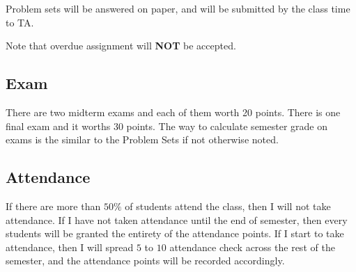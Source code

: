 \documentclass[12pt]{article}
\begin{document}
Problem sets will be answered on paper, and will be submitted by the class time to TA.

Note that overdue assignment will \textbf{NOT} be accepted.

\subsection*{Exam}
\label{sub:Exam}

There are two midterm exams and each of them worth 20 points.
There is one final exam and it worths 30 points.
The way to calculate semester grade on exams is the similar to the Problem Sets if not otherwise noted.

\subsection*{Attendance}
\label{sub:Attendance}

If there are more than $ 50\% $ of students attend the class, then I will not take attendance.
If I have not taken attendance until the end of semester, then every students will be granted the entirety of the attendance points.
If I start to take attendance, then I will spread $ 5 $ to $ 10 $ attendance check across the rest of the semester, and the attendance points will be recorded accordingly.






\end{document}
